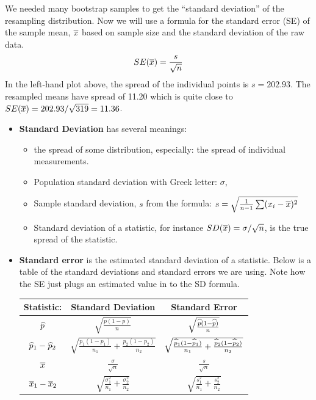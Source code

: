 We needed many bootstrap samples to get  the
``standard deviation'' of the resampling distribution.  Now we will use a
formula for the standard error (SE) of the sample mean, $\overline{x}$ based on
sample size and the standard deviation of the raw data.  
$$SE(\overline{x}) = \frac{s}{\sqrt{n}}$$
In the left-hand plot above, the spread of the individual points is $s
= 202.93$. The resampled means have spread of 11.20 which is quite
close to $SE(\overline{x}) = 202.93/\sqrt{319} = 11.36$.  
\begin{itemize}
\item {\bf Standard Deviation} has several meanings:
  \begin{itemize}
    \item the spread of some  distribution, especially: the spread of
      individual  measurements.
    \item Population standard deviation with  Greek letter: $\sigma$,
    \item Sample standard deviation, $s$ from the formula: $s =
      \sqrt{\frac{1}{n-1}\sum(x_i - \overline{x})^2}$
    \item  Standard deviation of a statistic, for instance  $SD(\overline{x})
      =\sigma/\sqrt{n}$, is the true spread of the statistic.
  \end{itemize}

\item {\bf Standard error} is the estimated standard deviation of a
  statistic. Below is a table of the  standard deviations and standard
  errors we  are using.  Note how the SE just plugs an estimated value
  in to the SD formula.\\
  \begin{center}
  \begin{tabular}{|c|c|c|}\hline
    Statistic: & Standard Deviation & Standard Error\\ \hline
    $\widehat{p}$ & $\sqrt{\frac{p(1-p)}{n}}$ & $\sqrt{\frac{\widehat{p}(1-\widehat{p})}{n}}$\\
    \hline
    $\widehat{p}_1 - \widehat{p}_2$&  $\sqrt{\frac{p_1(1-p_1)}{n_1}
      +\frac{p_2(1-p_2)}{n_2} }$ & $\sqrt{\frac{\widehat{p}_1(1-\widehat{p}_1)}{n_1}
      +\frac{\widehat{p}_2(1-\widehat{p}_2)}{n_2} }$\\ \hline
     $\overline{x}$ & $\frac{\sigma}{\sqrt{n}}$ & $\frac{s}{\sqrt{n}}$ \\\hline
     $\overline{x}_1 - \overline{x}_2$ & $\sqrt{\frac{\sigma_1^2}{n_1} +\frac{\sigma_2^2}{n_2}} $
      & $\sqrt{\frac{s_1^2}{n_1} +\frac{s_2^2}{n_2}} $  \\ \hline
  \end{tabular}\vspace{.1in}    
  \end{center}
\end{itemize}

